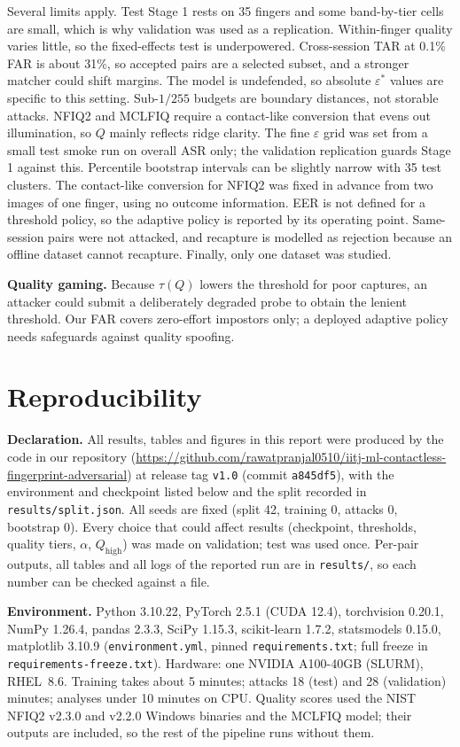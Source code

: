 \documentclass[10pt,twocolumn,letterpaper]{article}
\newcommand{\eps}{\varepsilon}
\newcommand{\repo}{https://github.com/rawatpranjal0510/iitj-ml-contactless-fingerprint-adversarial}
\begin{document}
Several limits apply. Test Stage 1 rests on 35 fingers and some band-by-tier cells are small, which is why validation was used as a replication. Within-finger quality varies little, so the fixed-effects test is underpowered. Cross-session TAR at 0.1\% FAR is about 31\%, so accepted pairs are a selected subset, and a stronger matcher could shift margins. The model is undefended, so absolute $\eps^*$ values are specific to this setting. Sub-$1/255$ budgets are boundary distances, not storable attacks. NFIQ2 and MCLFIQ require a contact-like conversion that evens out illumination, so $Q$ mainly reflects ridge clarity. The fine $\eps$ grid was set from a small test smoke run on overall ASR only; the validation replication guards Stage 1 against this. Percentile bootstrap intervals can be slightly narrow with 35 test clusters. The contact-like conversion for NFIQ2 was fixed in advance from two images of one finger, using no outcome information. EER is not defined for a threshold policy, so the adaptive policy is reported by its operating point. Same-session pairs were not attacked, and recapture is modelled as rejection because an offline dataset cannot recapture. Finally, only one dataset was studied.

\textbf{Quality gaming.} Because $\tau(Q)$ lowers the threshold for poor captures, an attacker could submit a deliberately degraded probe to obtain the lenient threshold. Our FAR covers zero-effort impostors only; a deployed adaptive policy needs safeguards against quality spoofing.

\section{Reproducibility}
\label{sec:repro}
\textbf{Declaration.} All results, tables and figures in this report were produced by the code in our repository (\url{\repo}) at release tag \texttt{v1.0} (commit \texttt{a845df5}), with the environment and checkpoint listed below and the split recorded in \texttt{results/split.json}. All seeds are fixed (split 42, training 0, attacks 0, bootstrap 0). Every choice that could affect results (checkpoint, thresholds, quality tiers, $\alpha$, $Q_{\mathrm{high}}$) was made on validation; test was used once. Per-pair outputs, all tables and all logs of the reported run are in \texttt{results/}, so each number can be checked against a file.

\textbf{Environment.} Python 3.10.22, PyTorch 2.5.1 (CUDA 12.4), torchvision 0.20.1, NumPy 1.26.4, pandas 2.3.3, SciPy 1.15.3, scikit-learn 1.7.2, statsmodels 0.15.0, matplotlib 3.10.9 (\texttt{environment.yml}, pinned \texttt{requirements.txt}; full freeze in \texttt{requirements-freeze.txt}). Hardware: one NVIDIA A100-40GB (SLURM), RHEL~8.6. Training takes about 5 minutes; attacks 18 (test) and 28 (validation) minutes; analyses under 10 minutes on CPU. Quality scores used the NIST NFIQ2 v2.3.0 and v2.2.0 Windows binaries and the MCLFIQ model; their outputs are included, so the rest of the pipeline runs without them.
\end{document}
